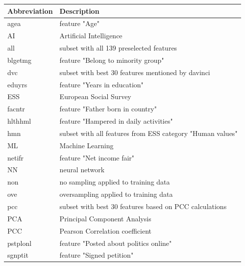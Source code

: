 \documentclass[10pt]{article}
\begin{document}
	\begin{table}[h!]
		\centering
		\begin{tabular}{@{}ll@{}}
			\toprule
			Abbreviation & Description                                          \\ \midrule
			agea         & feature "Age"                                                  \\ 
			AI			& Artificial Intelligence 						\\ 
			all          & subset with all 139 preselected features                                         \\ 
			blgetmg      & feature "Belong to minority group"                             \\ 
			dvc          & subset with best 30 features mentioned by davinci                \\ 
			eduyrs       & feature "Years in education"                                   \\ 
			ESS			& European Social Survey							\\ 
			facntr       & feature "Father born in country"                              \\ 
			hlthhml      & feature "Hampered in daily activities"                         \\ 
			hmn          & subset with all features from ESS category "Human values"                                         \\ 
			ML			& Machine Learning									 \\  
			netifr       & feature "Net income fair"                                      \\ 
			NN			& neural network									\\
			non          & no sampling applied to training data                                          \\ 
			ove          & oversampling applied to training data                                            \\ 
			pcc          & subset with best 30 features based on PCC calculations\\ 
			PCA         & Principal Component Analysis\\
			PCC			& Pearson Correlation coefficient \\ 
			pstplonl     & feature "Posted about politics online"                         \\ 
			sgnptit      & feature "Signed petition"                                      \\ 

\end{tabular}
\end{table}
\end{document}
